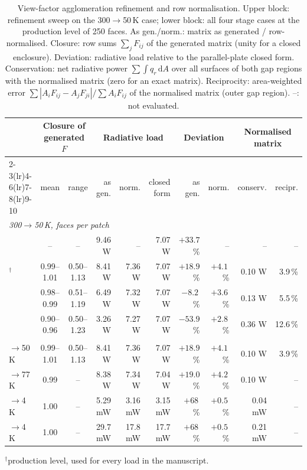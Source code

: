 \documentclass[11pt]{article}
\begin{document}
\begin{table}[H]\centering\footnotesize
\caption{View-factor agglomeration refinement and row normalisation. Upper block: refinement sweep
on the 300$\to$50\,K case; lower block: all four stage cases at the production level of 250 faces.
As gen./norm.: matrix as generated / row-normalised. Closure: row sums $\sum_jF_{ij}$ of the generated matrix (unity for a closed enclosure). Deviation:
radiative load relative to the parallel-plate closed form. Conservation: net radiative power
$\sum\int q_r\,\mathrm dA$ over all surfaces of both gap regions with the normalised matrix (zero for an
exact matrix). Reciprocity: area-weighted error $\sum|A_iF_{ij}-A_jF_{ji}|/\sum A_iF_{ij}$ of the
normalised matrix (outer gap region). --: not evaluated.}
\setlength{\tabcolsep}{4pt}\renewcommand{\arraystretch}{1.15}
\begin{tabular}{l c c r r r r r r r}
\toprule
 & \multicolumn{2}{c}{Closure of generated $F$} & \multicolumn{3}{c}{Radiative load} & \multicolumn{2}{c}{Deviation} & \multicolumn{2}{c}{Normalised matrix} \\
\cmidrule(lr){2-3}\cmidrule(lr){4-6}\cmidrule(lr){7-8}\cmidrule(lr){9-10}
 & mean & range & as gen. & norm. & closed form & as gen. & norm. & conserv. & recipr. \\
\midrule
\multicolumn{10}{l}{\textit{300$\to$50\,K, faces per patch}} \\
\quad 60 & -- & -- & 9.46 W & -- & 7.07 W & $+33.7$\,\% & -- & -- & -- \\
\quad 250$^{\dagger}$ & 0.99--1.01 & 0.50--1.13 & 8.41 W & 7.36 W & 7.07 W & $+18.9$\,\% & $+4.1$\,\% & 0.10 W & 3.9\,\% \\
\quad 400 & 0.98--0.99 & 0.51--1.19 & 6.49 W & 7.32 W & 7.07 W & $-8.2$\,\% & $+3.6$\,\% & 0.13 W & 5.5\,\% \\
\quad 800 & 0.90--0.96 & 0.50--1.23 & 3.26 W & 7.27 W & 7.07 W & $-53.9$\,\% & $+2.8$\,\% & 0.36 W & 12.6\,\% \\
\addlinespace[3pt]
\multicolumn{10}{l}{\textit{All stage cases, 250 faces$^{\dagger}$}} \\
\quad 300$\to$50\,K & 0.99--1.01 & 0.50--1.13 & 8.41 W & 7.36 W & 7.07 W & $+18.9$\,\% & $+4.1$\,\% & 0.10 W & 3.9\,\% \\
\quad 300$\to$77\,K & 0.99 & -- & 8.38 W & 7.34 W & 7.04 W & $+19.0$\,\% & $+4.2$\,\% & 0.10 W & -- \\
\quad 50$\to$4\,K & 1.00 & -- & 5.29 mW & 3.16 mW & 3.15 mW & $+68$\,\% & $+0.5$\,\% & 0.04 mW & -- \\
\quad 77$\to$4\,K & 1.00 & -- & 29.7 mW & 17.8 mW & 17.7 mW & $+68$\,\% & $+0.5$\,\% & 0.21 mW & -- \\
\bottomrule
\end{tabular}
\par\smallskip\footnotesize $^{\dagger}$production level, used for every load in the manuscript.
\end{table}
\end{document}
